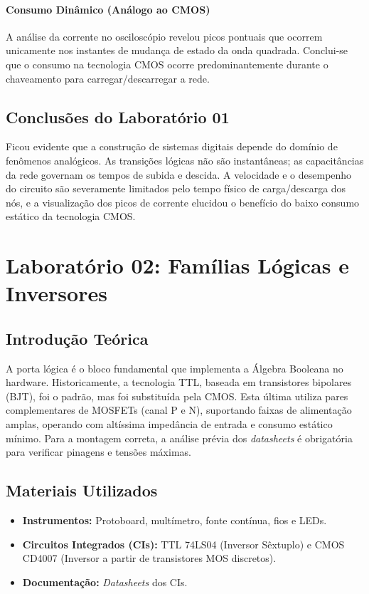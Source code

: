 \documentclass[conference]{IEEEtran}
\begin{document}
\paragraph{Consumo Dinâmico (Análogo ao CMOS)}
A análise da corrente no osciloscópio revelou picos pontuais que ocorrem unicamente nos instantes de mudança de estado da onda quadrada. Conclui-se que o consumo na tecnologia CMOS ocorre predominantemente durante o chaveamento para carregar/descarregar a rede.

\subsection{Conclusões do Laboratório 01}
Ficou evidente que a construção de sistemas digitais depende do domínio de fenômenos analógicos. As transições lógicas não são instantâneas; as capacitâncias da rede governam os tempos de subida e descida. A velocidade e o desempenho do circuito são severamente limitados pelo tempo físico de carga/descarga dos nós, e a visualização dos picos de corrente elucidou o benefício do baixo consumo estático da tecnologia CMOS.

\section{Laboratório 02: Famílias Lógicas e Inversores}

\subsection{Introdução Teórica}
A porta lógica é o bloco fundamental que implementa a Álgebra Booleana no hardware. Historicamente, a tecnologia TTL, baseada em transistores bipolares (BJT), foi o padrão, mas foi substituída pela CMOS. Esta última utiliza pares complementares de MOSFETs (canal P e N), suportando faixas de alimentação amplas, operando com altíssima impedância de entrada e consumo estático mínimo. Para a montagem correta, a análise prévia dos \textit{datasheets} é obrigatória para verificar pinagens e tensões máximas.

\subsection{Materiais Utilizados}
\begin{itemize}
    \item \textbf{Instrumentos:} Protoboard, multímetro, fonte contínua, fios e LEDs.
    \item \textbf{Circuitos Integrados (CIs):} TTL 74LS04 (Inversor Sêxtuplo) e CMOS CD4007 (Inversor a partir de transistores MOS discretos).
    \item \textbf{Documentação:} \textit{Datasheets} dos CIs.
\end{itemize}
\end{document}

